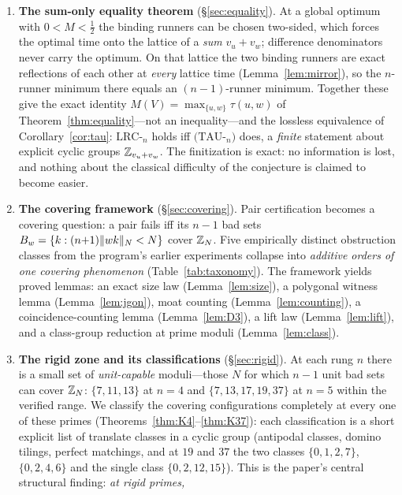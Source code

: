 \begin{enumerate}[leftmargin=1.6em,itemsep=2pt]
\item \textbf{The sum-only equality theorem}
  (\S\ref{sec:equality}). At a global optimum with $0<M<\tfrac12$ the
  binding runners can be chosen two-sided, which forces the optimal time
  onto the lattice of a \emph{sum} $v_u+v_w$; difference denominators never
  carry the optimum. On that lattice the two binding runners are exact
  reflections of each other at \emph{every} lattice time
  (Lemma~\ref{lem:mirror}), so the $n$-runner minimum there equals an
  $(n{-}1)$-runner minimum. Together these give the exact identity
  $M(V)=\max_{\{u,w\}}\tau(u,w)$ of Theorem~\ref{thm:equality}---not an
  inequality---and the lossless equivalence of
  Corollary~\ref{cor:tau}: $\mathrm{LRC}$-$_n$ holds iff
  $(\mathrm{TAU}$-$_n)$ does, a \emph{finite} statement about explicit
  cyclic groups $\mathbb{Z}_{v_u+v_w}$. The finitization is exact: no information
  is lost, and nothing about the classical difficulty of the conjecture is
  claimed to become easier.
\item \textbf{The covering framework} (\S\ref{sec:covering}). Pair
  certification becomes a covering question: a pair fails iff its $n-1$ bad
  sets $B_w=\{k : (n{+}1)\lVert wk \rVert_{N}<N\}$ cover $\mathbb{Z}_N$. Five empirically
  distinct obstruction classes from the program's earlier experiments
  collapse into \emph{additive orders of one covering phenomenon}
  (Table~\ref{tab:taxonomy}). The framework yields proved lemmas: an exact
  size law (Lemma~\ref{lem:size}), a polygonal witness lemma
  (Lemma~\ref{lem:jgon}), moat counting (Lemma~\ref{lem:counting}), a
  coincidence-counting lemma (Lemma~\ref{lem:D3}), a lift law
  (Lemma~\ref{lem:lift}), and a class-group reduction at prime moduli
  (Lemma~\ref{lem:class}).
\item \textbf{The rigid zone and its classifications}
  (\S\ref{sec:rigid}). At each rung $n$ there is a small set of
  \emph{unit-capable} moduli---those $N$ for which $n-1$ unit bad sets can
  cover $\mathbb{Z}_N$: $\{7,11,13\}$ at $n=4$ and $\{7,13,17,19,37\}$ at $n=5$
  within the verified range. We classify the covering configurations
  completely at every one of these primes
  (Theorems~\ref{thm:K4}--\ref{thm:K37}): each classification is a short
  explicit list of translate classes in a cyclic group (antipodal classes,
  domino tilings, perfect matchings, and at $19$ and $37$ the two classes
  $\{0,1,2,7\}$, $\{0,2,4,6\}$ and the single class $\{0,2,12,15\}$).
  This is the paper's central structural finding: \emph{at rigid primes,
}
\end{enumerate}
